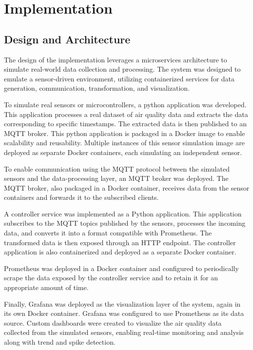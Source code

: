 \chapter{Implementation} \label{ch:implementation}

\section{Design and Architecture}
The design of the implementation leverages a microservices architecture to simulate real-world data collection and processing. The system was designed to emulate a sensor-driven environment, utilizing containerized services for data generation, communication, transformation, and visualization.

To simulate real sensors or microcontrollers, a python application was developed. This application processes a real dataset of air quality data and extracts the data corresponding to specific timestamps. The extracted data is then published to an MQTT broker. This python application is packaged in a Docker image to enable scalability and reusability. Multiple instances of this sensor simulation image are deployed as separate Docker containers, each simulating an independent sensor.

To enable communication using the MQTT protocol between the simulated sensors and the data-processing layer, an MQTT broker was deployed. The MQTT broker, also packaged in a Docker container, receives data from the sensor containers and forwards it to the subscribed clients.

A controller service was implemented as a Python application. This application subscribes to the MQTT topics published by the sensors, processes the incoming data, and converts it into a format compatible with Prometheus. The transformed data is then exposed through an HTTP endpoint. The controller application is also containerized and deployed as a separate Docker container.

Prometheus was deployed in a Docker container and configured to periodically scrape the data exposed by the controller service and to retain it for an appropriate amount of time.

Finally, Grafana was deployed as the visualization layer of the system, again in its own Docker container. Grafana was configured to use Prometheus as its data source. Custom dashboards were created to visualize the air quality data collected from the simulated sensors, enabling real-time monitoring and analysis along with trend and spike detection.

